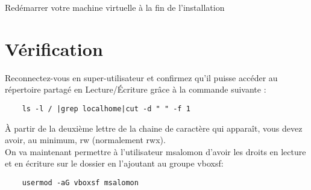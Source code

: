 Redémarrer votre machine virtuelle à la fin de l'installation

\section{Vérification}

Reconnectez-vous en super-utilisateur et confirmez qu'il puisse accéder au répertoire partagé en Lecture/Écriture grâce à la commande suivante :

\begin{lstlisting}
	ls -l / |grep localhome|cut -d " " -f 1
\end{lstlisting}

À partir de la deuxième lettre de la chaine de caractère qui apparaît, vous devez avoir, au minimum, rw (normalement rwx).\\

On va maintenant permettre à l'utilisateur msalomon d'avoir les droits en lecture et en écriture sur le dossier en l'ajoutant au groupe vboxsf:

\begin{lstlisting}
	usermod -aG vboxsf msalomon
\end{lstlisting}
